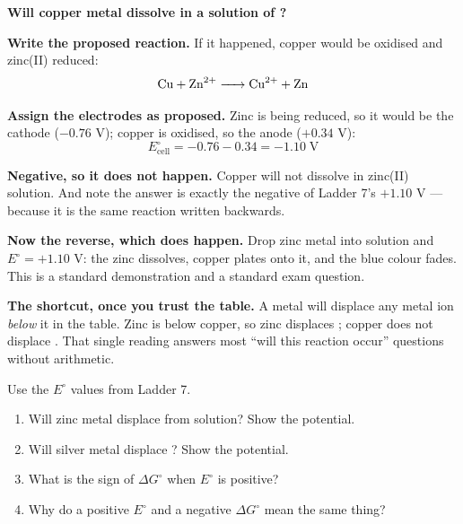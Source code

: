 \documentclass{apchem-worksheet}
\begin{document}
\begin{workedexample}
\textbf{Will copper metal dissolve in a solution of ?}

\textbf{Write the proposed reaction.} If it happened, copper would be
oxidised and zinc(II) reduced:
\[ \ce{Cu + Zn^2+ -> Cu^2+ + Zn} \]

\textbf{Assign the electrodes as proposed.} Zinc is being reduced, so it
would be the cathode ($-0.76$ V); copper is oxidised, so the anode
($+0.34$ V):
\[ E^{\circ}_{\text{cell}} = -0.76 - 0.34 = -1.10\;\text{V} \]

\textbf{Negative, so it does not happen.} Copper will not dissolve in
zinc(II) solution. And note the answer is exactly the negative of
Ladder 7's $+1.10$ V --- because it is the same reaction written
backwards.

\textbf{Now the reverse, which does happen.} Drop zinc metal into
 solution and $E^{\circ} = +1.10$ V: the zinc dissolves, copper
plates onto it, and the blue colour fades. This is a standard
demonstration and a standard exam question.

\textbf{The shortcut, once you trust the table.} A metal will displace
any metal ion \emph{below} it in the table. Zinc is below copper, so
zinc displaces ; copper does not displace . That
single reading answers most ``will this reaction occur'' questions
without arithmetic.
\end{workedexample}

\begin{yourturn}
Use the $E^{\circ}$ values from Ladder 7.
\begin{enumerate}[leftmargin=*,itemsep=0.5em]
  \item Will zinc metal displace  from solution? Show the
        potential. \workspace[1.8cm]
  \item Will silver metal displace ? Show the potential.
        \workspace[1.8cm]
  \item What is the sign of $\Delta G^{\circ}$ when $E^{\circ}$ is
        positive? \workspace[1.4cm]
  \item Why do a positive $E^{\circ}$ and a negative $\Delta G^{\circ}$
        mean the same thing? \workspace[1.8cm]
\end{enumerate}
\end{yourturn}
\end{document}
